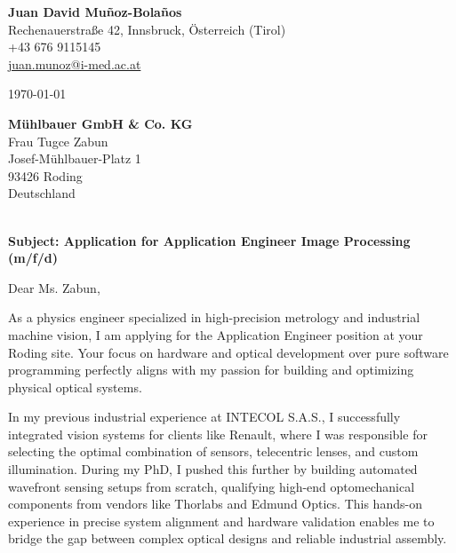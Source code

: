 \documentclass[11pt,a4paper]{article}
\begin{document}
\textbf{\large Juan David Muñoz-Bolaños} \\
Rechenauerstraße 42, Innsbruck, Österreich (Tirol) \\
+43 676 9115145 \\
\href{mailto:juan.munoz@i-med.ac.at}{juan.munoz@i-med.ac.at}

\vspace{8pt}
\begin{flushright}
  \vspace{-20pt}
  \today
\end{flushright}

\textbf{Mühlbauer GmbH \& Co. KG} \\
Frau Tugce Zabun \\
Josef-Mühlbauer-Platz 1 \\
93426 Roding \\
Deutschland \\
 \\


\vspace{8pt}

\textbf{Subject: Application for Application Engineer Image Processing (m/f/d)}

\vspace{4pt}

Dear Ms. Zabun,


As a physics engineer specialized in high-precision metrology and industrial machine vision, I am applying for the Application Engineer position at your Roding site. Your focus on hardware and optical development over pure software programming perfectly aligns with my passion for building and optimizing physical optical systems. 


In my previous industrial experience at INTECOL S.A.S., I successfully integrated vision systems for clients like Renault, where I was responsible for selecting the optimal combination of sensors, telecentric lenses, and custom illumination. During my PhD, I pushed this further by building automated wavefront sensing setups from scratch, qualifying high-end optomechanical components from vendors like Thorlabs and Edmund Optics. This hands-on experience in precise system alignment and hardware validation enables me to bridge the gap between complex optical designs and reliable industrial assembly. 
\end{document}
